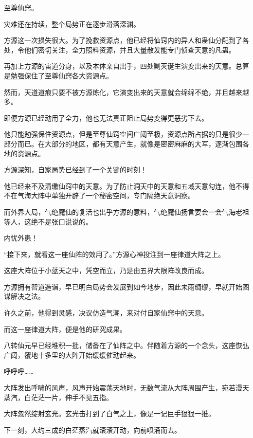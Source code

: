 
\begin{this_body}

至尊仙窍。

灾难还在持续，整个局势正在逐步滑落深渊。

方源这一次损失很大。为了挽救资源点，他已经将仙窍内的异人和蛊仙分配到了各处，令他们密切关注，全力照料资源，并且大量散发能专门侦查天意的凡蛊。

再加上方源的宙道分身，以及本体亲自出手，四处剿灭诞生演变出来的天意。总算是勉强保住了至尊仙窍各大资源点。

然而，天道道痕只要不被方源炼化，它演变出来的天意就会绵绵不绝，并且越来越多。

即便方源已经动用了全力，他也无法真正阻止局势变得更恶劣下去。

他只能勉强保住资源点，但是至尊仙窍空间广阔至极，资源点所占据的只是很少一部分而已。在大部分的地区，都有天意产生，就像是密密麻麻的大军，逐渐包围各地的资源点。

方源深知，自家局势已经到了一个关键的时刻！

他已经来不及清缴仙窍中的天意。为了防止洞天中的天意和五域天意勾连，他不得不在气海大阵中单独开辟了一个秘密空间，专门隔绝天意洞察。

而外界大局，气绝魔仙的复活也出乎方源的意料，气绝魔仙扬言要会一会气海老祖等人，这绝不是张口说说的。

内忧外患！

“接下来，就看这一座仙阵的效用了。”方源心神投注到一座律道大阵之上。

这座大阵位于小蓝天之中，凭空而立，乃是由五界大限阵改良而成。

方源拥有智道造诣，早已明白局势会发展到如今地步，因此未雨绸缪，早就开始图谋解决之法。

许久之前，他得到灵感，决议仿造气潮，来对付自家仙窍中的天意。

而这一座律道大阵，便是他的研究成果。

八转仙元早已经堆积一批，储备在了仙阵之中。伴随着方源的一个念头，这座恢弘广阔，覆地十多里的大阵开始缓缓催动起来。

呼呼呼……

大阵发出呼啸的风声，风声开始震荡天地时，无数气流从大阵周围产生，宛若漫天蒸汽，白茫茫一片，伸手不见五指。

大阵忽然绽射玄光。玄光击打到了白气之上，像是一记巨手狠狠一推。

下一刻，大约三成的白茫蒸汽就滚滚开动，向前喷涌而去。


\end{this_body}
